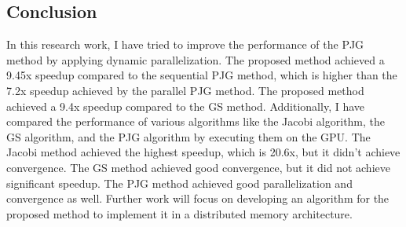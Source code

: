 \documentclass[11pt]{article}       %
\begin{document}
\subsection{Conclusion} \label{conclusion}

In this research work, I have tried to improve the performance of the PJG method by applying dynamic parallelization. The proposed method achieved a 9.45x speedup compared to the sequential PJG method, which is higher than the 7.2x speedup achieved by the parallel PJG method. The proposed method achieved a 9.4x speedup compared to the GS method. Additionally, I have compared the performance of various algorithms like the Jacobi algorithm, the GS algorithm, and the PJG algorithm by executing them on the GPU. The Jacobi method achieved the highest speedup, which is 20.6x, but it didn't achieve convergence. The GS method achieved good convergence, but it did not achieve significant speedup. The PJG method achieved good parallelization and convergence as well. Further work will focus on developing an algorithm for the proposed method to implement it in a distributed memory architecture.



\end{document}

